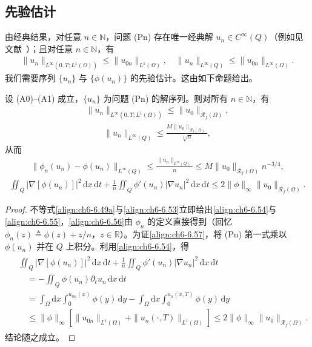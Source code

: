 \documentclass[../../main.tex]{subfiles}%
\begin{document}
\subsection{先验估计}\label{subsection:ch06-先验估计}

由经典结果，对任意 $n\in\mathbb{N}$，问题 (Pn) 存在唯一经典解 $u_n\in C^\infty(Q)$（例如见文献~\cite{ref63}）；且对任意 $n\in\mathbb{N}$，有
\begin{align}
\|u_n\|_{L^\infty(0,T;L^1(\Omega))}\leqslant\|u_{0n}\|_{L^1(\Omega)},\quad
\|u_n\|_{L^\infty(Q)}\leqslant\|u_{0n}\|_{L^\infty(\Omega)}. \label{align:ch6-6.53}
\end{align}
我们需要序列 $\{u_n\}$ 与 $\{\phi(u_n)\}$ 的先验估计。这由如下命题给出。

\begin{lemma}\label{lemma:ch06-6.5.3}
设 (A0)--(A1) 成立，$\{u_n\}$ 为问题 (Pn) 的解序列。则对所有 $n\in\mathbb{N}$，有
\begin{align}
\|u_n\|_{L^\infty(0,T;L^1(\Omega))}\leqslant\|u_0\|_{\mathscr{R}_f(\Omega)}, \label{align:ch6-6.54}
\end{align}
\begin{align}
\|u_n\|_{L^\infty(Q)}\leqslant\frac{M\|u_0\|_{\mathscr{R}_f(\Omega)}}{\sqrt[4]{n}}, \label{align:ch6-6.55}
\end{align}
从而
\begin{align}
\|\phi_n(u_n)-\phi(u_n)\|_{L^\infty(Q)}
\leqslant\frac{\|u_n\|_{L^\infty(Q)}}{n}
\leqslant M\|u_0\|_{\mathscr{R}_f(\Omega)}n^{-3/4}, \label{align:ch6-6.56}
\end{align}
\begin{align}
\iint_Q|\nabla[\phi(u_n)]|^2\,\mathrm{d}x\,\mathrm{d}t
+\frac{1}{n}\iint_Q\phi'(u_n)|\nabla u_n|^2\,\mathrm{d}x\,\mathrm{d}t
\leqslant2\|\phi\|_\infty\|u_0\|_{\mathscr{R}_f(\Omega)}. \label{align:ch6-6.57}
\end{align}
\end{lemma}

\begin{proof}
不等式\eqref{align:ch6-6.49a}与\eqref{align:ch6-6.53}立即给出\eqref{align:ch6-6.54}与\eqref{align:ch6-6.55}，\eqref{align:ch6-6.56}由 $\phi_n$ 的定义直接得到（回忆 $\phi_n(z)\triangleq \phi(z)+z/n$，$z\in\mathbb{R}$）。为证\eqref{align:ch6-6.57}，将 (Pn) 第一式乘以 $\phi(u_n)$ 并在 $Q$ 上积分。利用\eqref{align:ch6-6.54}，得
\begin{align*}
\begin{aligned}
&\iint_Q|\nabla[\phi(u_n)]|^2\,\mathrm{d}x\,\mathrm{d}t
+\frac{1}{n}\iint_Q\phi'(u_n)|\nabla u_n|^2\,\mathrm{d}x\,\mathrm{d}t\\
&\quad=-\iint_Q\phi(u_n)\partial_t u_n\,\mathrm{d}x\,\mathrm{d}t\\
&\quad=\int_\Omega\mathrm{d}x\int_0^{u_{0n}(x)}\phi(y)\,\mathrm{d}y
-\int_\Omega\mathrm{d}x\int_0^{u_n(x,T)}\phi(y)\,\mathrm{d}y\\
&\quad\leqslant\|\phi\|_\infty[\|u_{0n}\|_{L^1(\Omega)}+\|u_n(\cdot,T)\|_{L^1(\Omega)}]
\leqslant2\|\phi\|_\infty\|u_0\|_{\mathscr{R}_f(\Omega)}.
\end{aligned}
\end{align*}
结论随之成立。
\end{proof}
\end{document}
